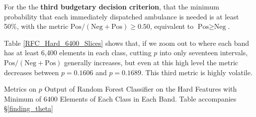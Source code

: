 \FloatBarrier

For the the {\bf third budgetary decision criterion}, that the minimum probability that each immediately dispatched ambulance is needed is at least 50\%, with the metric $\text{Pos}/(\text{Neg}+\text{Pos}) \ge 0.50$, equivalent to $\text{Pos} \ge \text{Neg}$.  

Table \ref{RFC_Hard_6400_Slices} shows that, if we zoom out to where each band has at least 6,400 elements in each class, cutting $p$ into only seventeen intervals, $\text{Pos}/(\text{Neg}+\text{Pos})$ generally increases, but even at this high level the metric decreases between $p=0.1606$ and $p = 0.1689$.  This third metric is highly volatile.  


\begin{table}
\caption{
	\normalsize\normalfont
	Metrics on $p$ Output of Random Forest Classifier on the Hard Features with Minimum of 6400 Elements of Each Class in Each Band.  Table accompanies \S\ref{finding_theta}
}
\label{RFC_Hard_6400_Slices}


\end{table}
